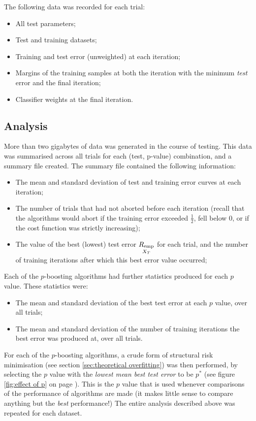 The following data was recorded for each trial:
%
\begin{itemize}
\item	All test parameters;
\item	Test and training datasets;
\item	Training and test error (unweighted) at each iteration;
\item	Margins of the training samples at both the iteration with the
	minimum \emph{test} error and the final iteration;
\item	Classifier weights at the final iteration.
\end{itemize}


\subsection{Analysis}

More than two gigabytes of data was generated in the course of
testing.  This data was summarised across all trials for each (test,
p-value) combination, and a summary file created.  The summary file
contained the following information:
%
\begin{itemize}
\item	The mean and standard deviation of test and training error
	curves at each iteration;
\item	The number of trials that had not aborted before each
	iteration (recall that the algorithms would abort if the
	training error exceeded $\frac{1}{2}$, fell below $0$, or if
	the cost function was strictly increasing); 
\item	The value of the best (lowest) test error
	$\underset{X_T}{R_{\mathrm{emp}}}$ for each trial, and the number of
	training iterations after which this best error value
	occurred;
\end{itemize}
%
Each of the $p$-boosting algorithms had further statistics produced
for each $p$ value.  These statistics were:
%
\begin{itemize}
\item	The mean and standard deviation of the best test error at each
	$p$ value, over all trials;
\item	The mean and standard deviation of the number of training
	iterations the best error was produced at, over all trials.
\end{itemize}

For each of the $p$-boosting algorithms, a crude form of structural
risk minimisation (see section \ref{sec:theoretical overfitting}) was
then performed, by selecting the $p$ value with the \emph{lowest mean
best test error} to be $p^{\ast}$ (see figure \ref{fig:effect of p} on
page \pageref{fig:effect of p}).  This is the $p$ value that is used 
whenever comparisons of the performance of algorithms are made (it
makes little sense to compare anything but the \emph{best}
performance!)  The entire analysis described above was repeated for
each dataset.





